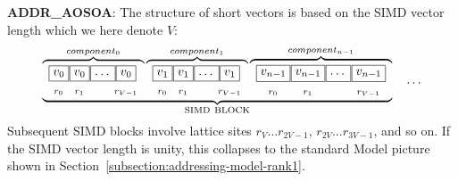 \textbf{ADDR\_AOSOA}: The structure of short vectors is based on the
SIMD vector length which we here denote $V$:
\[
\underbrace{
\overbrace{
\begin{array}{cc} \boxed{v_0} \\  _{r_0} \end{array} \mkern-17mu
\begin{array}{cc} \boxed{v_0} \\  _{r_1} \end{array} \mkern-17mu
\begin{array}{cc} \boxed{\ldots\vphantom{v_0}} \\ \phantom{r_2}\end{array} \mkern-20mu
\begin{array}{cc} \boxed{v_0} \\  _{r_{V-1}} \end{array}
}^{component_0}
\overbrace{
\begin{array}{cc} \boxed{v_1} \\  _{r_0} \end{array} \mkern-17mu
\begin{array}{cc} \boxed{v_1} \\  _{r_1} \end{array} \mkern-17mu
\begin{array}{cc} \boxed{\ldots\vphantom{v_0}} \\ \phantom{r_2}\end{array} \mkern-20mu
\begin{array}{cc} \boxed{v_1} \\  _{r_{V-1}} \end{array}
}^{component_1}
\overbrace{
\begin{array}{cc} \boxed{v_{n-1}} \\  _{r_0} \end{array} \mkern-17mu
\begin{array}{cc} \boxed{v_{n-1}} \\  _{r_1} \end{array} \mkern-17mu
\begin{array}{cc} \boxed{\ldots\vphantom{v_{n-1}}} \\ \phantom{r_2}\end{array}
\mkern-17mu
\begin{array}{cc} \boxed{v_{n-1}} \\  _{r_{V-1}} \end{array}
}^{component_{n-1}}}_{\mathrm{SIMD\ BLOCK}}
\quad\ldots
\]
Subsequent SIMD blocks involve lattice sites $r_V \ldots r_{2V-1}$,
$r_{2V} \ldots r_{3V-1}$, and so on. If the SIMD vector length is unity,
this collapses to the standard Model picture shown in
Section~\ref{subsection:addressing-model-rank1}.

